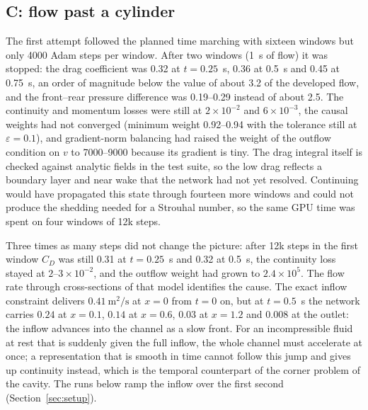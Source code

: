 \subsection{C: flow past a cylinder}
\label{sec:res-cylinder}

The first attempt followed the planned time marching with sixteen windows but only 4000 Adam steps per window.
After two windows (1~s of flow) it was stopped: the drag coefficient was 0.32 at $t=0.25$~s, 0.36 at 0.5~s and
0.45 at 0.75~s, an order of magnitude below the value of about 3.2 of the developed flow, and the front--rear
pressure difference was 0.19--0.29 instead of about 2.5. The continuity and momentum losses were still at
$2\times10^{-2}$ and $6\times10^{-3}$, the causal weights had not converged (minimum weight 0.92--0.94 with the
tolerance still at $\varepsilon=0.1$), and gradient-norm balancing had raised the weight of the outflow
condition on $v$ to 7000--9000 because its gradient is tiny. The drag integral itself is checked against
analytic fields in the test suite, so the low drag reflects a boundary layer and near wake that the network had
not yet resolved. Continuing would have propagated this state through fourteen more windows and could not
produce the shedding needed for a Strouhal number, so the same GPU time was spent on four windows of 12k steps.

Three times as many steps did not change the picture: after 12k steps in the first window $C_D$ was still 0.31 at
$t=0.25$~s and 0.32 at 0.5~s, the continuity loss stayed at $2$--$3\times10^{-2}$, and the outflow weight had grown
to $2.4\times10^5$. The flow rate through cross-sections of that model identifies the cause. The exact inflow
constraint delivers $0.41~\mathrm{m^2/s}$ at $x=0$ from $t=0$ on, but at $t=0.5$~s the network carries
$0.24$ at $x=0.1$, $0.14$ at $x=0.6$, $0.03$ at $x=1.2$ and $0.008$ at the outlet: the inflow advances into the
channel as a slow front. For an incompressible fluid at rest that is suddenly given the full inflow, the whole
channel must accelerate at once; a representation that is smooth in time cannot follow this jump and gives up
continuity instead, which is the temporal counterpart of the corner problem of the cavity. The runs below
ramp the inflow over the first second (Section~\ref{sec:setup}).

